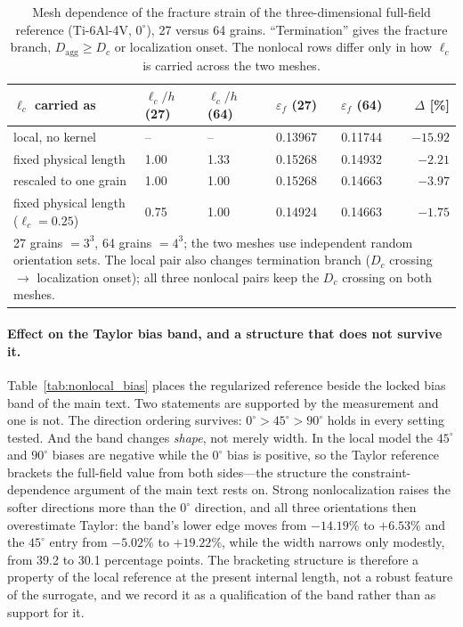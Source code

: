 \documentclass[12pt,a4paper,twocolumn]{article}
\providecommand{\ang}[1]{\ensuremath{#1^{\circ}}}
\begin{document}
\begin{table}[htbp]
\centering
\caption{Mesh dependence of the fracture strain of the three-dimensional full-field reference (Ti-6Al-4V,
$\ang{0}$), 27 versus 64 grains. ``Termination'' gives the fracture branch, $D_{\mathrm{agg}} \ge D_c$ or
localization onset. The nonlocal rows differ only in how $\ell_c$ is carried across the two meshes.}
\label{tab:nonlocal_mesh}
\footnotesize
\setlength{\tabcolsep}{3pt}
\begin{tabular}{p{}p{}p{}ccr}
\toprule
$\ell_c$ carried as & $\ell_c/h$ (27) & $\ell_c/h$ (64) & $\varepsilon_f$ (27) & $\varepsilon_f$ (64) & $\Delta$ [\%] \\
\midrule
local, no kernel & -- & -- & 0.13967 & 0.11744 & $-15.92$ \\
fixed physical length & 1.00 & 1.33 & 0.15268 & 0.14932 & $-2.21$ \\
rescaled to one grain & 1.00 & 1.00 & 0.15268 & 0.14663 & $-3.97$ \\
fixed physical length ($\ell_c = 0.25$) & 0.75 & 1.00 & 0.14924 & 0.14663 & $-1.75$ \\
\bottomrule
\multicolumn{6}{p{0.97\columnwidth}}{\footnotesize 27 grains $= 3^3$, 64 grains $= 4^3$; the two meshes use
independent random orientation sets. The local pair also changes termination branch ($D_c$ crossing $\to$
localization onset); all three nonlocal pairs keep the $D_c$ crossing on both meshes.}
\end{tabular}
\end{table}

\paragraph{Effect on the Taylor bias band, and a structure that does not survive it.} Table~\ref{tab:nonlocal_bias}
places the regularized reference beside the locked bias band of the main text. Two statements are supported by
the measurement and one is not. The direction ordering survives: $\ang{0} > \ang{45} > \ang{90}$ holds in every
setting tested. And the band changes \emph{shape}, not merely width. In the local model the $\ang{45}$ and
$\ang{90}$ biases are negative while the $\ang{0}$ bias is positive, so the Taylor reference brackets the
full-field value from both sides---the structure the constraint-dependence argument of the main text rests on.
Strong nonlocalization raises the softer directions more than the $\ang{0}$ direction, and all three
orientations then overestimate Taylor: the band's lower edge moves from $-14.19\%$ to $+6.53\%$ and the
$\ang{45}$ entry from $-5.02\%$ to $+19.22\%$, while the width narrows only modestly, from 39.2 to 30.1
percentage points. The bracketing structure is therefore a property of the local reference at the present
internal length, not a robust feature of the surrogate, and we record it as a qualification of the band rather
than as support for it.
\end{document}
